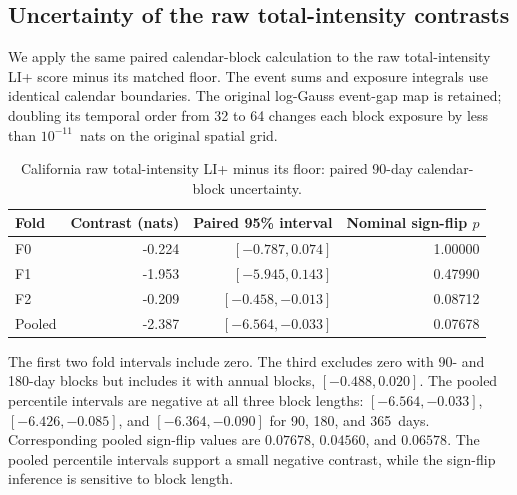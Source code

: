 \subsection{Uncertainty of the raw total-intensity contrasts}
\label{sec:li-score-uncertainty}
We apply the same paired calendar-block calculation to the raw total-intensity
LI+ score minus its matched floor. The event sums and exposure integrals use
identical calendar boundaries. The original log-Gauss event-gap map is retained;
doubling its temporal order from 32 to 64 changes each block exposure by less
than $10^{-11}$~nats on the original spatial grid.

\begin{table}[htbp]
\centering
\begin{tabular}{lrrr}
\toprule
Fold & Contrast (nats) & Paired 95\% interval & Nominal sign-flip $p$ \\
\midrule
F0 & -0.224 & $[-0.787,0.074]$ & 1.00000 \\
F1 & -1.953 & $[-5.945,0.143]$ & 0.47990 \\
F2 & -0.209 & $[-0.458,-0.013]$ & 0.08712 \\
\midrule
Pooled & -2.387 & $[-6.564,-0.033]$ & 0.07678 \\
\bottomrule
\end{tabular}
\caption{California raw total-intensity LI+ minus its floor: paired 90-day calendar-block uncertainty.}
\label{tab:ca_li_floor_uncertainty}
\end{table}

The first two fold intervals include zero. The third excludes zero with 90- and 180-day blocks but includes it with annual blocks, $[-0.488,0.020]$. The pooled percentile intervals are negative at all three block lengths: $[-6.564,-0.033]$, $[-6.426,-0.085]$, and $[-6.364,-0.090]$ for 90, 180, and 365~days. Corresponding pooled sign-flip values are $0.07678$, $0.04560$, and $0.06578$. The pooled percentile intervals support a small negative contrast, while the sign-flip inference is sensitive to block length.
